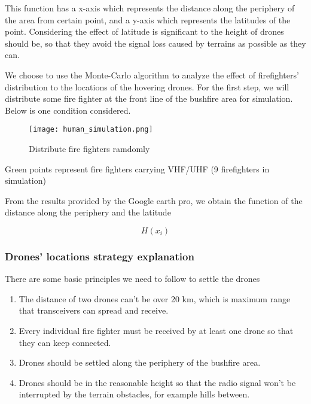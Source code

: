 \documentclass[../main]{subfiles}
\begin{document}
This function has a x-axis which represents the distance along the
periphery of the area from certain point, and a y-axis which represents
the latitudes of the point. Considering the effect of latitude is
significant to the height of drones should be, so that they avoid the
signal loss caused by terrains as possible as they can.

We choose to use the Monte-Carlo algorithm to analyze the effect of
firefighters' distribution to the locations of the hovering drones. For
the first step, we will distribute some fire fighter at the front line
of the bushfire area for simulation. Below is one condition considered.

\begin{figure}[h!]
      \centering
      \captionsetup{justification=centering}
      \texttt{[image: human\_simulation.png]}
      \caption{Distribute fire fighters ramdomly}
      \end{figure}
      
Green points represent fire fighters carrying VHF/UHF (9 firefighters in simulation)

From the results provided by the Google earth pro, we obtain the
function of the distance along the periphery and the latitude

\begin{equation}
H(x_i)
\end{equation}

\subsubsection{Drones' locations strategy explanation}

There are some basic principles we need to follow to settle the drones

\begin{enumerate}
\def\labelenumi{\arabic{enumi}.}
\item
  The distance of two drones can't be over 20 km, which is maximum range
  that transceivers can spread and receive.
\item
  Every individual fire fighter must be received by at least one drone
  so that they can keep connected.
\item
  Drones should be settled along the periphery of the bushfire area.
\item
  Drones should be in the reasonable height so that the radio signal
  won't be interrupted by the terrain obstacles, for example hills
  between.
\end{enumerate}
\end{document}
